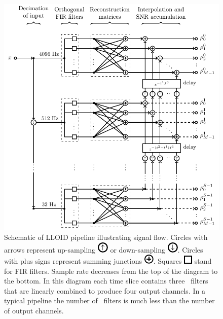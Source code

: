 \begin{figure}[htbp]
	\includegraphics{figures/lloid-diagram.pdf}
	\caption{\label{fig:pipeline} Schematic of LLOID pipeline illustrating
signal flow.  Circles with arrows represent up-sampling
\protect\includegraphics{figures/upsample-symbol.pdf} or down-sampling
\protect\includegraphics{figures/downsample-symbol.pdf}.  Circles with plus
signs represent summing junctions
\protect\includegraphics{figures/adder-symbol.pdf}.  Squares
\protect\includegraphics{figures/fir-symbol.pdf} stand for FIR filters.  Sample
rate decreases from the top of the diagram to the bottom.  In this diagram each
time slice contains three \fir\ filters that are linearly combined to produce
four output channels.  In a typical pipeline the number of \fir\ filters is
much less than the number of output channels.}
\end{figure}

